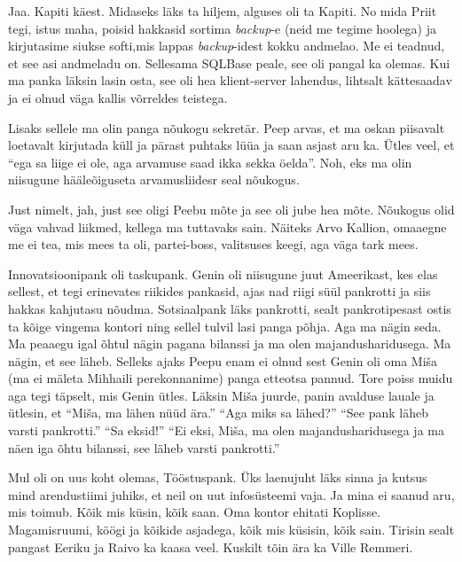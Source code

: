
Jaa. Kapiti käest. Midaseks läks ta hiljem, alguses oli ta Kapiti. No mida Priit tegi, istus maha,  poisid hakkasid sortima \emph{backup}-e (neid me tegime hoolega) ja kirjutasime siukse softi,mis lappas \emph{backup}-idest kokku andmelao. Me ei teadnud, et see asi andmeladu on. Sellesama SQLBase peale, see oli pangal ka olemas. Kui ma panka läksin lasin osta, see oli hea klient-server lahendus, lihtsalt kättesaadav ja ei olnud väga kallis võrreldes teistega. 

Lisaks sellele ma olin panga nõukogu sekretär. Peep arvas, et ma oskan piisavalt loetavalt kirjutada küll ja pärast puhtaks lüüa ja saan asjast aru ka. Ütles veel, et \enquote{ega sa liige ei ole, aga arvamuse saad ikka sekka öelda}. Noh, eks ma olin niisugune hääleõiguseta arvamusliidesr seal nõukogus.


Just nimelt, jah, just see oligi Peebu mõte ja see oli jube hea mõte. Nõukogus olid väga vahvad liikmed, kellega ma tuttavaks sain. Näiteks Arvo Kallion, omaaegne me ei tea, mis mees ta oli, partei-boss, valitsuses keegi, aga väga tark mees. 

Innovatsioonipank oli taskupank. Genin oli niisugune juut Ameerikast, kes elas sellest, et tegi erinevates riikides pankasid, ajas nad riigi süül pankrotti ja siis hakkas kahjutasu nõudma. Sotsiaalpank läks pankrotti, sealt pankrotipesast ostis ta kõige vingema kontori ning sellel tulvil lasi panga põhja. Aga ma nägin seda. Ma peaaegu igal õhtul nägin pagana bilanssi ja ma olen majandusharidusega. Ma nägin, et see läheb. Selleks ajaks Peepu enam ei olnud sest Genin oli oma Miša (ma ei mäleta Mihhaili perekonnanime) panga etteotsa pannud. Tore poiss muidu aga tegi täpselt, mis Genin ütles. Läksin Miša juurde, panin avalduse lauale ja ütlesin, et \enquote{Miša, ma lähen nüüd ära.}  \enquote{Aga miks sa lähed?} \enquote{See pank läheb varsti pankrotti.} \enquote{Sa eksid!} \enquote{Ei eksi, Miša, ma olen majandusharidusega ja ma näen iga õhtu bilanssi, see läheb varsti pankrotti.} 

Mul oli on uus koht olemas, Tööstuspank. Üks laenujuht läks sinna ja kutsus mind arendustiimi juhiks, et neil on uut infosüsteemi vaja. Ja mina ei saanud aru, mis toimub. Kõik mis küsin, kõik saan. Oma kontor ehitati Koplisse. Magamisruumi, köögi ja kõikide asjadega, kõik mis küsisin, kõik sain. Tirisin sealt pangast Eeriku ja  Raivo ka kaasa veel. Kuskilt tõin ära ka Ville Remmeri.


